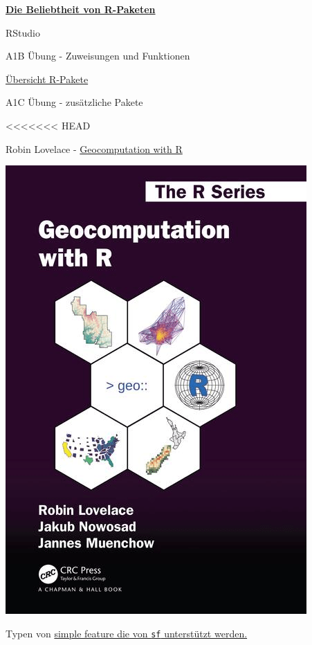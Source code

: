 \documentclass[ignorenonframetext,]{beamer}
\begin{document}
\begin{frame}{\href{https://gallery.shinyapps.io/cran-gauge/}{\textbf{Die
Beliebtheit von R-Paketen}}}
\begin{frame}{RStudio}
\begin{frame}[fragile]{A1B Übung - Zuweisungen und Funktionen}
\begin{frame}{\href{https://www.youtube.com/watch?v=kKI9--Opmso}{Übersicht
R-Pakete}}
\begin{frame}{A1C Übung - zusätzliche Pakete}
\end{frame}

<<<<<<< HEAD
\begin{frame}{Robin Lovelace -
\href{https://geocompr.robinlovelace.net/}{Geocomputation with R}}

\includegraphics{figure/cover_lovelace.png}

\end{frame}

\begin{frame}{Typen von
\href{https://geocompr.robinlovelace.net/spatial-class.html}{simple
feature die von \texttt{sf} unterstützt werden.}}


\end{frame}
\end{frame}
\end{frame}
\end{frame}
\end{frame}
\end{document}
